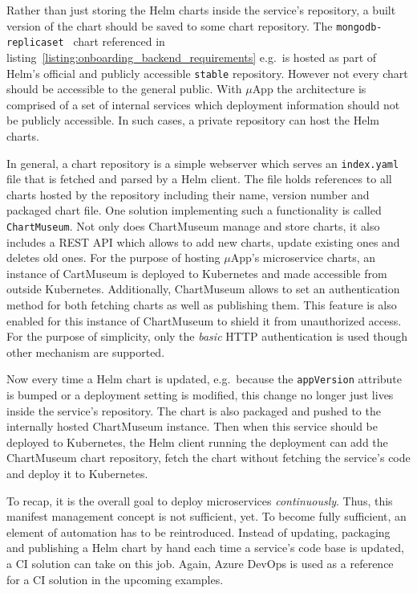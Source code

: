 Rather than just storing the Helm charts inside the service's repository, a
built version of the chart should be saved to some chart repository. The
\texttt{mongodb-replicaset } chart referenced in
listing~\ref{listing:onboarding_backend_requirements} e.g.\ is hosted as part
of Helm's official and publicly accessible \texttt{stable} repository. However
not every chart should be accessible to the general public.  With $\mu$App the
architecture is comprised of a set of internal services which deployment
information should not be publicly accessible. In such cases, a private
repository can host the Helm charts.

In general, a chart repository is a simple webserver which serves an
\texttt{index.yaml} file that is fetched and parsed by a Helm client. The file
holds references to all charts hosted by the repository including their name,
version number and packaged chart file. One solution implementing such a
functionality is called \texttt{ChartMuseum}. Not only does ChartMuseum manage
and store charts, it also includes a \ac{REST} \ac{API} which allows to add new
charts, update existing ones and deletes old ones. For the purpose of hosting
$\mu$App's microservice charts, an instance of CartMuseum is deployed to
Kubernetes and made accessible from outside Kubernetes. Additionally,
ChartMuseum allows to set an authentication method for both fetching charts as
well as publishing them. This feature is also enabled for this instance of
ChartMuseum to shield it from unauthorized access. For the purpose of
simplicity, only the \textit{basic} \ac{HTTP} authentication is used though
other mechanism are supported.

Now every time a Helm chart is updated, e.g.\ because the \texttt{appVersion}
attribute is bumped or a deployment setting is modified, this change no longer
just lives inside the service's repository. The chart is also packaged and
pushed to the internally hosted ChartMuseum instance. Then when this service
should be deployed to Kubernetes, the Helm client running the deployment can
add the ChartMuseum chart repository, fetch the chart without fetching the
service's code and deploy it to Kubernetes.

To recap, it is the overall goal to deploy microservices \textit{continuously}.
Thus, this manifest management concept is not sufficient, yet. To become fully
sufficient, an element of automation has to be reintroduced. Instead of
updating, packaging and publishing a Helm chart by hand each time a service's
code base is updated, a \ac{CI} solution can take on this job. Again, Azure
DevOps is used as a reference for a \ac{CI} solution in the upcoming examples.


